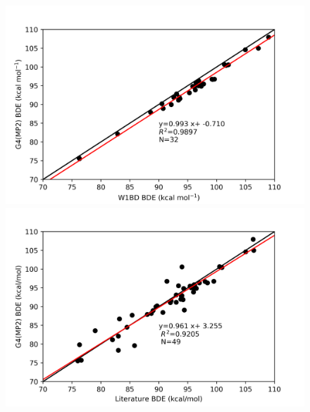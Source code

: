 \begin{figure}
\hspace*{-1.5cm}
\begin{minipage}{8cm}
  \centering
  \includegraphics[width=\textwidth]{figures/w1bd-g4mp2}
\end{minipage}%
\begin{minipage}{8cm}
  \centering
  \includegraphics[width=\textwidth]{figures/lit-g4mp2}
\end{minipage}
\end{figure}



